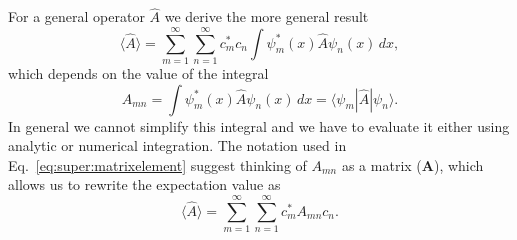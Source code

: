 \documentclass[../Main/chem331-notes.tex]{subfiles}
\begin{document}
For a general operator $\hat{A}$ we derive the more general result
\begin{equation}
\langle \hat{A} \rangle = \sum_{m = 1}^\infty \sum_{n = 1}^\infty   c^*_m c_n \int \psi^*_m(x) \hat{A} \psi_n(x) \, dx,
\end{equation}
which depends on the value of the integral
\begin{equation}
\label{eq:super:matrixelement}
A_{mn} = \int \psi^*_m(x) \hat{A} \psi_n(x) \, dx = \langle{\psi_m}|\hat{A}|{\psi_n}\rangle.
\end{equation}
In general we cannot simplify this integral and we have to evaluate it either using analytic or numerical integration.
The notation used in Eq.~\eqref{eq:super:matrixelement} suggest thinking of $A_{mn}$ as a matrix ($\mathbf{A}$), which allows us to rewrite the expectation value as
\begin{equation}
\langle \hat{A} \rangle = \sum_{m = 1}^\infty \sum_{n = 1}^\infty   c^*_m A_{mn} c_n.
\end{equation}
\end{document}
